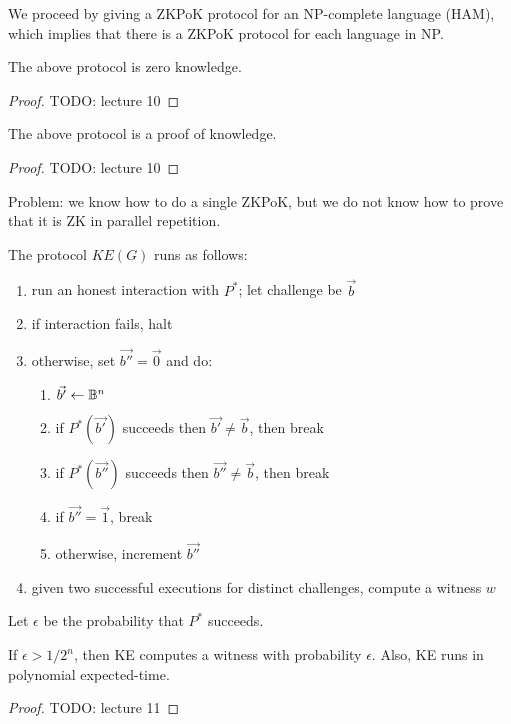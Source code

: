 We proceed by giving a ZKPoK protocol for an NP-complete language (HAM), which implies that there is a ZKPoK protocol for each language in NP.


\begin{thm}
The above protocol is zero knowledge.
\end{thm}
\begin{proof}
TODO: lecture 10
\end{proof}

\begin{thm}
The above protocol is a proof of knowledge.
\end{thm}
\begin{proof}
TODO: lecture 10
\end{proof}

Problem: we know how to do a single ZKPoK, but we do not know how to prove that it is ZK in parallel repetition.

\begin{prcl}[KE]
The protocol $KE(G)$ runs as follows:
\begin{enumerate}
\item run an honest interaction with $P^*$; let challenge be $\vec{b}$
\item if interaction fails, halt
\item otherwise, set $\vec{b''} = \vec{0}$ and do:
\begin{enumerate}
    \item $\vec{b'} \gets \mathbb{B}^n$
    \item if $P^*(\vec{b'})$ succeeds then $\vec{b'} \neq \vec{b}$, then break
    \item if $P^*(\vec{b''})$ succeeds then $\vec{b''} \neq \vec{b}$, then break
    \item if $\vec{b''} = \vec{1}$, break
    \item otherwise, increment $\vec{b''}$
\end{enumerate}
\item given two successful executions for distinct challenges, compute a witness $w$
\end{enumerate}
Let $\epsilon$ be the probability that $P^*$ succeeds.
\end{prcl}

\begin{thm}
If $\epsilon > 1/2^n$, then KE computes a witness with probability $\epsilon$. Also, KE runs in polynomial expected-time.
\end{thm}
\begin{proof}
TODO: lecture 11
\end{proof}

